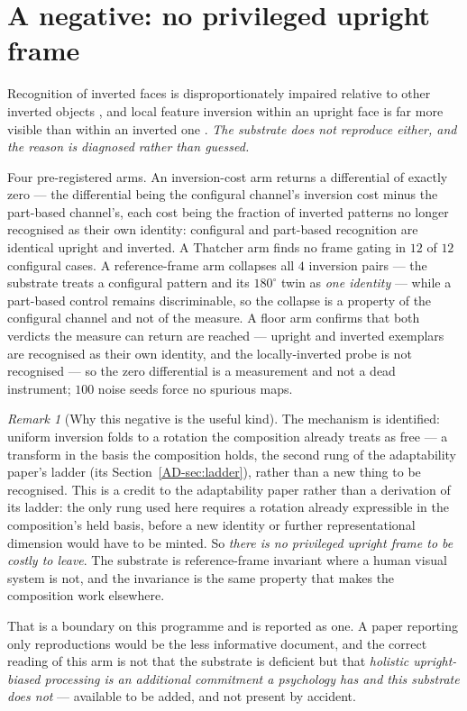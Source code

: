 \documentclass[11pt,a4paper]{article}
\theoremstyle{remark}
\newtheorem{remark}[definition]{Remark}
\begin{document}
\section{A negative: no privileged upright frame}\label{sec:inversion}
Recognition of inverted faces is disproportionately impaired relative to other inverted objects
\citep{yin1969}, and local feature inversion within an upright face is far more visible than within an
inverted one \citep{thompson1980}. \emph{The substrate does not reproduce either, and the reason is
diagnosed rather than guessed.}

Four pre-registered arms. An inversion-cost arm returns a differential of exactly zero --- the
differential being the configural channel's inversion cost minus the part-based channel's, each
cost being the fraction of inverted patterns no longer recognised as their own identity: configural
and part-based recognition are identical upright and inverted. A Thatcher arm finds no frame gating in
$12$ of $12$ configural cases. A reference-frame arm collapses all $4$ inversion pairs --- the
substrate treats a configural pattern and its $180^{\circ}$ twin as \emph{one identity} --- while a
part-based control remains discriminable, so the collapse is a property of the configural channel and
not of the measure. A floor arm confirms that both verdicts the measure can return are reached --- upright and
inverted exemplars are recognised as their own identity, and the locally-inverted probe is not
recognised --- so the zero differential is a measurement and not a dead instrument; $100$ noise
seeds force no spurious maps.

\begin{remark}[Why this negative is the useful kind]\label{rem:negative}
The mechanism is identified: uniform inversion folds to a rotation the composition already treats as
free --- a transform in the basis the composition holds, the second rung of the adaptability paper's
ladder (its Section~\ref{AD-sec:ladder}), rather than a new thing to be recognised. This is a
credit to the adaptability paper rather than a derivation of its ladder: the only rung used here
requires a rotation already expressible in the composition's held basis, before a new identity or
further representational dimension would have to be minted. So
\emph{there is no privileged upright frame to be costly to leave}. The substrate is
reference-frame invariant where a human visual system is not, and the invariance is the same property
that makes the composition work elsewhere.

That is a boundary on this programme and is reported as one. A paper reporting only reproductions
would be the less informative document, and the correct reading of this arm is not that the substrate
is deficient but that \emph{holistic upright-biased processing is an additional commitment a
psychology has and this substrate does not} --- available to be added, and not present by accident.
\end{remark}
\end{document}
